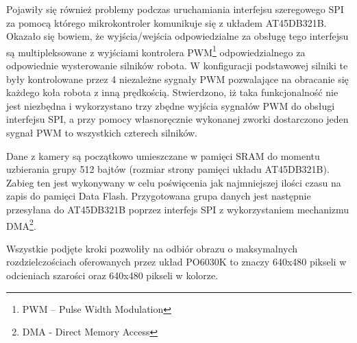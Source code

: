 Pojawiły się również problemy podczas uruchamiania interfejsu szeregowego SPI za
pomocą którego mikrokontroler komunikuje się z układem AT45DB321B. Okazało się
bowiem, że wyjścia/wejścia odpowiedzialne za obsługę tego interfejsu są
multipleksowane z wyjściami kontrolera PWM\footnote{PWM -- Pulse Width
Modulation} odpowiedzialnego za odpowiednie wysterowanie silników robota. W
konfiguracji podstawowej silniki te były kontrolowane przez 4 niezależne sygnały
PWM pozwalające na obracanie się każdego koła robota z inną prędkością.
Stwierdzono, iż taka funkcjonalność nie jest niezbędna i wykorzystano trzy zbędne
wyjścia sygnałów PWM do obsługi interfejsu SPI, a przy pomocy własnoręcznie
wykonanej zworki dostarczono jeden sygnał PWM to wszystkich czterech silników.

Dane z kamery są początkowo umieszczane w pamięci SRAM do momentu uzbierania
grupy 512 bajtów (rozmiar strony pamięci układu AT45DB321B). Zabieg ten jest
wykonywany w celu poświęcenia jak najmniejszej ilości czasu na zapis do pamięci
Data Flash. Przygotowana grupa danych jest następnie przesyłana do AT45DB321B
poprzez interfejs SPI z wykorzystaniem mechanizmu DMA\footnote{DMA - Direct
Memory Access}.

Wszystkie podjęte kroki pozwoliły na odbiór obrazu o maksymalnych
rozdzielczościach oferowanych przez układ PO6030K to znaczy 640x480 pikseli w
odcieniach szarości oraz 640x480 pikseli w kolorze.